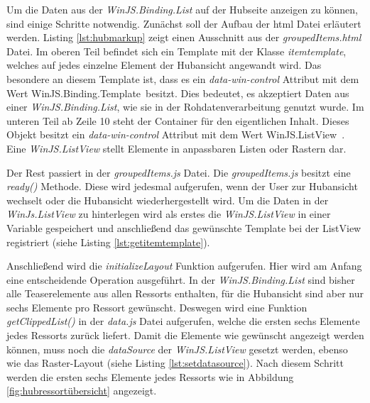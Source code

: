 \documentclass[12pt,a4paper,bibtotoc,abstracton]{scrartcl}
\begin{document}
Um die Daten aus der \textit{WinJS.Binding.List} auf der Hubseite anzeigen zu können, sind einige Schritte notwendig. Zunächst soll der Aufbau der \ac{html} Datei erläutert werden. Listing \ref{lst:hubmarkup} zeigt einen Ausschnitt aus der \textit{groupedItems.html} Datei. Im oberen Teil befindet sich ein Template mit der Klasse \textit{itemtemplate}, welches auf jedes einzelne Element der Hubansicht angewandt wird. Das besondere an diesem Template ist, dass es ein \textit{data-win-control} Attribut mit dem Wert \glqq WinJS.Binding.Template\grqq\ besitzt. Dies bedeutet, es akzeptiert Daten aus einer \textit{WinJS.Binding.List}, wie sie in der Rohdatenverarbeitung genutzt wurde. Im unteren Teil ab Zeile 10 steht der Container für den eigentlichen Inhalt. Dieses Objekt besitzt ein \textit{data-win-control} Attribut mit dem Wert \glqq WinJS.ListView\grqq\ . Eine \textit{WinJS.ListView} stellt Elemente in anpassbaren Listen oder Rastern dar. 

\begin{minipage}{\linewidth}
  
\end{minipage}

Der Rest passiert in der \textit{groupedItems.js} Datei. Die \textit{groupedItems.js} besitzt eine \textit{ready()} Methode. Diese wird jedesmal aufgerufen, wenn der User zur Hubansicht wechselt oder die Hubansicht wiederhergestellt wird. Um die Daten in der \textit{WinJs.ListView} zu hinterlegen wird als erstes die \textit{WinJS.ListView} in einer Variable gespeichert und anschließend das gewünschte Template bei der ListView registriert (siehe Listing \ref{lst:getitemtemplate}). 

\begin{minipage}{\linewidth}
  
\end{minipage}

Anschließend wird die \textit{initializeLayout} Funktion aufgerufen. Hier wird am Anfang eine entscheidende Operation ausgeführt. In der \textit{WinJS.Binding.List} sind bisher alle Teaserelemente aus allen Ressorts enthalten, für die Hubansicht sind aber nur sechs Elemente pro Ressort gewünscht. Deswegen wird eine Funktion \textit{getClippedList()} in der \textit{data.js} Datei aufgerufen, welche die ersten sechs Elemente jedes Ressorts zurück liefert. Damit die Elemente wie gewünscht angezeigt werden können, muss noch die \textit{dataSource} der \textit{WinJS.ListView} gesetzt werden, ebenso wie das Raster-Layout (siehe Listing \ref{lst:setdatasource}). Nach diesem Schritt werden die ersten sechs Elemente jedes Ressorts wie in Abbildung \ref{fig:hubressortübersicht} angezeigt.
\end{document}
